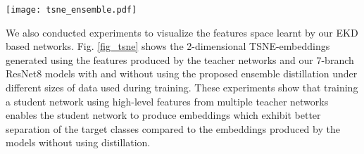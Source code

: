 \documentclass{ecai}
\begin{document}
\begin{figure*}[t!]
	\begin{center}
		\texttt{[image: tsne\_ensemble.pdf]}
		\vspace{-15pt}
		\caption{Comparison of TSNE visualizations of 2-dimensional embeddings generated using features produced by the proposed teacher networks (A, B, and C), our EKD-based ResNet8 (D), and a ResNet8 model without distillation (E), on the test data of CIFAR-10 dataset. The comparison shows that the embeddings produced by our EKD based models show better separation of the target classes especially in cases with limited training data compared to the embeddings produced by models trained without distillation.}
		\vspace{-5pt}
		\label{fig_tsne}
	\end{center}
\end{figure*}
We also conducted experiments to visualize the features space learnt by our EKD based networks. Fig. \ref{fig_tsne} shows the 2-dimensional TSNE-embeddings generated using the features produced by the teacher networks and our 7-branch ResNet8 models with and without using the proposed ensemble distillation under different sizes of data used during training. These experiments show that training a student network using high-level features from multiple teacher networks enables the student network to produce embeddings which exhibit better separation of the target classes compared to the embeddings produced by the models without using distillation.
\end{document}
